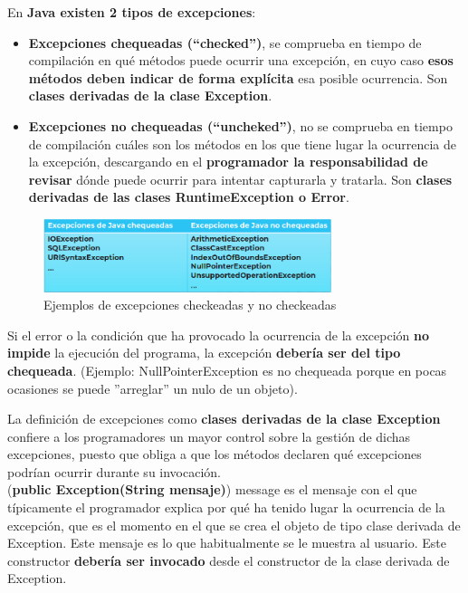 \documentclass{article}
\begin{document}
En \textbf{Java existen 2 tipos de excepciones}:
\begin{itemize}
    \item \textbf{Excepciones chequeadas (“checked”)}, se comprueba en tiempo de compilación en qué métodos puede ocurrir una excepción, en cuyo caso \textbf{esos métodos deben indicar de forma explícita} esa posible ocurrencia. Son \textbf{clases derivadas de la clase Exception}.
    
    \item \textbf{Excepciones no chequeadas (“uncheked”)}, no se comprueba en tiempo de compilación cuáles son los métodos en los que tiene lugar la ocurrencia de la excepción, descargando en el \textbf{programador la responsabilidad de revisar} dónde puede ocurrir para intentar capturarla y tratarla. Son \textbf{clases derivadas de las clases RuntimeException o Error}.
\end{itemize}

\begin{figure}[h]
    \centering
    \includegraphics[width=0.75\textwidth]{img-t7/img_823_21.png}
    \caption{Ejemplos de excepciones checkeadas y no checkeadas}
\end{figure}

Si el error o la condición que ha provocado la ocurrencia de la excepción \textbf{no impide} la ejecución del programa, la excepción \textbf{debería ser del tipo chequeada}. (Ejemplo: NullPointerException es no chequeada porque en pocas ocasiones se puede ”arreglar” un nulo de un objeto). \\

\newpage

La definición de excepciones como \textbf{clases derivadas de la clase Exception} confiere a los programadores un mayor control sobre la gestión de dichas excepciones, puesto que obliga a que los métodos declaren qué excepciones podrían ocurrir durante su invocación. \\


(\textbf{public Exception(String mensaje)}) message es el mensaje con el que típicamente el programador explica por qué ha tenido lugar la ocurrencia de la excepción, que es el momento en el que se crea el objeto de tipo clase derivada de Exception. Este mensaje es lo que habitualmente se le muestra al usuario. Este constructor \textbf{debería ser invocado} desde el constructor de la clase derivada de Exception.
\end{document}
